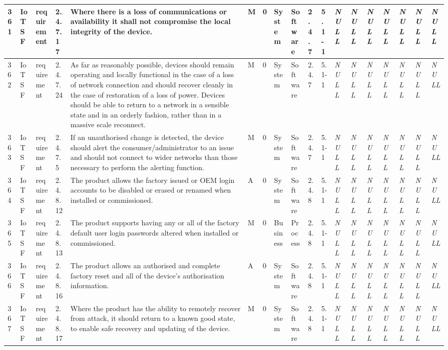 \begin{longtable}{|l|l|l|l|l|l|l|l|l|l|l|l|l|l|l|l|l|l|}
361 & IoTSF & requirement & 2.4.7.17 & Where there is a loss of communications or availability it shall not compromise the local integrity of the device. & M & 0 & System & Software & 2.4.7 & 5.1-1 & \textit{NULL} & \textit{NULL} & \textit{NULL} & \textit{NULL} & \textit{NULL} & \textit{NULL} & \textit{NULL} \\ \hline 
362 & IoTSF & requirement & 2.4.7.24 & As far as reasonably possible, devices should remain operating and locally functional in the case of a loss of network connection and should recover cleanly in the case of restoration of a loss of power. Devices should be able to return to a network in a sensible state and in an orderly fashion, rather than in a massive scale reconnect. & M & 0 & System & Software & 2.4.7 & 5.1-1 & \textit{NULL} & \textit{NULL} & \textit{NULL} & \textit{NULL} & \textit{NULL} & \textit{NULL} & \textit{NULL} \\ \hline 
363 & IoTSF & requirement & 2.4.7.5 & If an unauthorised change is detected, the device should alert the consumer/administrator to an issue and should not connect to wider networks than those necessary to perform the alerting function. & M & 0 & System & Software & 2.4.7 & 5.1-1 & \textit{NULL} & \textit{NULL} & \textit{NULL} & \textit{NULL} & \textit{NULL} & \textit{NULL} & \textit{NULL} \\ \hline 
364 & IoTSF & requirement & 2.4.8.12 & The product allows the factory issued or OEM login accounts to be disabled or erased or renamed when installed or commissioned. & A & 0 & System & Software & 2.4.8 & 5.1-1 & \textit{NULL} & \textit{NULL} & \textit{NULL} & \textit{NULL} & \textit{NULL} & \textit{NULL} & \textit{NULL} \\ \hline 
365 & IoTSF & requirement & 2.4.8.13 & The product supports having any or all of the factory default user login passwords altered when installed or commissioned. & M & 0 & Business & Process & 2.4.8 & 5.1-1 & \textit{NULL} & \textit{NULL} & \textit{NULL} & \textit{NULL} & \textit{NULL} & \textit{NULL} & \textit{NULL} \\ \hline 
366 & IoTSF & requirement & 2.4.8.16 & The product allows an authorised and complete factory reset and all of the device’s authorisation information. & A & 0 & System & Software & 2.4.8 & 5.1-1 & \textit{NULL} & \textit{NULL} & \textit{NULL} & \textit{NULL} & \textit{NULL} & \textit{NULL} & \textit{NULL} \\ \hline 
367 & IoTSF & requirement & 2.4.8.17 & Where the product has the ability to remotely recover from attack, it should return to a known good state, to enable safe recovery and updating of the device. & M & 0 & System & Software & 2.4.8 & 5.1-1 & \textit{NULL} & \textit{NULL} & \textit{NULL} & \textit{NULL} & \textit{NULL} & \textit{NULL} & \textit{NULL} \\ \hline 

\end{longtable}
